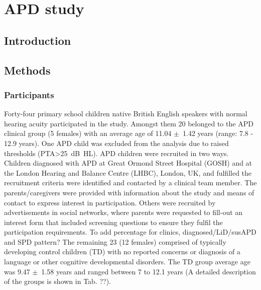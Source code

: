\documentclass[a4paper,nobind]{templates/ociamthesis}
\begin{document}
\setlength{\textbaselineskip}{22pt plus2pt}

\setlength{\parskip}{2pt plus 1pt}

\setlength{\baselineskip}{\textbaselineskip}

\hypertarget{APD-study}{%
\chapter{APD study}\label{APD-study}}


\minitoc 

\hypertarget{introduction}{%
\section{Introduction}\label{introduction}}

\hypertarget{methods}{%
\section{Methods}\label{methods}}

\hypertarget{participants}{%
\subsection{Participants}\label{participants}}

Forty-four primary school children native British English speakers with normal hearing acuity participated in the study. Amongst them 20 belonged to the APD clinical group (5 females) with an average age of 11.04 \(\pm\)~1.42 years (range: 7.8 - 12.9 years). One APD child was excluded from the analysis due to raised thresholds (PTA\textgreater25~dB~HL). APD children were recruited in two ways. Children diagnosed with APD at Great Ormond Street Hospital (GOSH) and at the London Hearing and Balance Centre (LHBC), London, UK, and fulfilled the recruitment criteria were identified and contacted by a clinical team member. The parents/caregivers were provided with information about the study and means of contact to express interest in participation. Others were recruited by advertisements in social networks, where parents were requested to fill-out an interest form that included screening questions to ensure they fulfil the participation requirements. {To add percentage for clinics, diagnosed/LiD/susAPD and SPD pattern?} The remaining 23 (12 females) comprised of typically developing control children (TD) with no reported concerns or diagnosis of a language or other cognitive developmental disorders. The TD group average age was 9.47 \(\pm\)~1.58 years and ranged between 7 to 12.1 years (A detailed description of the groups is shown in Tab. ??).
\end{document}
